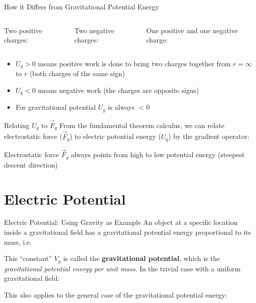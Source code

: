 \documentclass[12pt,aspectratio=169]{beamer}
\begin{document}
\begin{frame}{How it Differs from Gravitational Potential Energy}
  \begin{columns}
    \centering
    Two positive charges:

    
    \centering
    Two negative charges:

    
    \centering
    One positive and one negative charge:

  \end{columns}
  \begin{itemize}
  \item $U_q>0$ means positive work is done to bring two charges together from
   $r=\infty$ to $r$ (both charges of the same sign)
  \item $U_q<0$ means negative work (the charges are opposite signs)
  \item For gravitational potential $U_g$ is always $<0$
  \end{itemize}
\end{frame}



\begin{frame}{Relating $U_q$ to $\vec F_q$}
  From the fundamental theorem calculus, we can relate electrostatic force
  ($\vec F_q$) to electric potential energy ($U_q$) by the gradient operator:


  Electrostatic force $\vec F_q$ always points from high to low potential
  energy (steepest descent direction)
\end{frame}



\section{Electric Potential}

\begin{frame}{Electric Potential: Using Gravity as Example}
  An object at a specific location inside a gravitational field has a
  gravitational potential energy proportional to its mass, i.e.\

  
  This ``constant'' $V_g$ is called the \textbf{gravitational potential}, which
  is the \emph{gravitational potential energy per unit mass}. In the trivial
  case with a uniform gravitational field:


  This also applies to the general case of the gravitational
  potential energy:
  
\end{frame}
\end{document}
